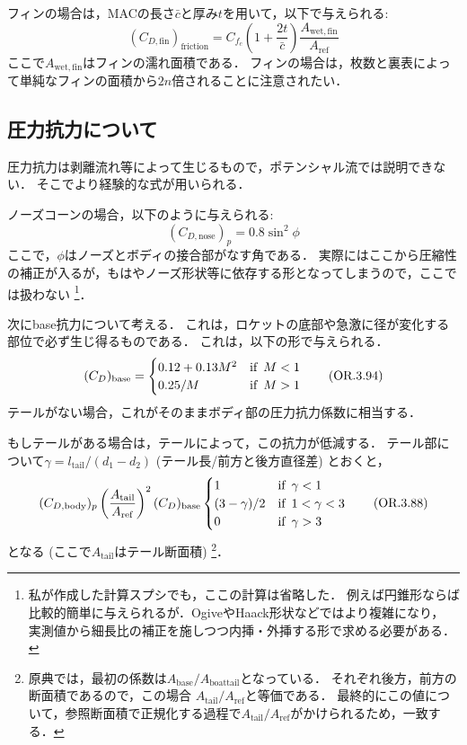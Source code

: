 \documentclass[uplatex,dvipdfmx,a4j,11pt]{jsarticle}
\begin{document}
フィンの場合は，MACの長さ$\bar{c}$と厚み$t$を用いて，以下で与えられる:
\begin{equation}
  (C_{D, \text{fin}})_\text{friction} = C_{f_c} \left(1 + \frac{2t}{\bar{c}}\right) \frac{A_\mathrm{wet, fin}}{A_\mathrm{ref}}
\end{equation}
ここで$A_\mathrm{wet, fin}$はフィンの濡れ面積である．
フィンの場合は，枚数と裏表によって単純なフィンの面積から$2n$倍されることに注意されたい．

\subsection{圧力抗力について}
圧力抗力は剥離流れ等によって生じるもので，ポテンシャル流では説明できない．
そこでより経験的な式が用いられる．


ノーズコーンの場合，以下のように与えられる:
\begin{equation}
  (C_{D, \text{nose}})_p = 0.8 \sin^2 \phi
  \tag{OR.3.86}
\end{equation}
ここで，$\phi$はノーズとボディの接合部がなす角である．
実際にはここから圧縮性の補正が入るが，もはやノーズ形状等に依存する形となってしまうので，ここでは扱わない
\footnote{
  私が作成した計算スプシでも，ここの計算は省略した．
  例えば円錐形ならば比較的簡単に与えられるが．OgiveやHaack形状などではより複雑になり，
  実測値から細長比の補正を施しつつ内挿・外挿する形で求める必要がある．
}．

\enskip

次にbase抗力について考える．
これは，ロケットの底部や急激に径が変化する部位で必ず生じ得るものである．
これは，以下の形で与えられる．
\begin{equation}
  (C_{D})_\mathrm{base} = 
  \begin{cases}
    0.12 + 0.13 M^2 & \text{if\, } M < 1\\
    0.25 / M & \text{if\, } M > 1
  \end{cases}
  \tag{OR.3.94}
\end{equation}
テールがない場合，これがそのままボディ部の圧力抗力係数に相当する．

もしテールがある場合は，テールによって，この抗力が低減する．
テール部について$\gamma = l_\mathrm{tail}/(d_1 - d_2)$ (テール長/前方と後方直径差) とおくと，
\begin{equation}
  (C_{D, \text{body}})_p 
  \left(\frac{A_\text{tail}}{A_\mathrm{ref}}\right)^2 (C_{D})_\mathrm{base} 
  \begin{cases}
    1 & \text{if\, } \gamma < 1 \\
    (3 - \gamma)/2 & \text{if\, } 1 < \gamma < 3 \\
    0 & \text{if\, } \gamma > 3
  \end{cases}
  \tag{OR.3.88}
\end{equation}
となる (ここで$A_\text{tail}$はテール断面積)
\footnote{
  原典では，最初の係数は$A_\text{base}/A_\text{boattail}$となっている．
  それぞれ後方，前方の断面積であるので，この場合 $A_\text{tail} / A_\text{ref}$と等価である．
  最終的にこの値について，参照断面積で正規化する過程で$A_\text{tail} / A_\text{ref}$がかけられるため，一致する．
}．
\end{document}
